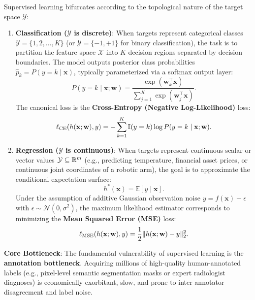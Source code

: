 Supervised learning bifurcates according to the topological nature of the target space $\mathcal{Y}$:
\begin{enumerate}
  \item \textbf{Classification ($\mathcal{Y}$ is discrete)}:
  When targets represent categorical classes $\mathcal{Y} = \{1, 2, \dots, K\}$ (or $\mathcal{Y} = \{-1, +1\}$ for binary classification), the task is to partition the feature space $\mathcal{X}$ into $K$ decision regions separated by decision boundaries. The model outputs posterior class probabilities $\hat{p}_k = P(y=k \mid \mathbf{x})$, typically parameterized via a softmax output layer:
  \begin{equation}
  P(y=k \mid \mathbf{x}; \mathbf{w}) = \frac{\exp(\mathbf{w}_k^\top \mathbf{x})}{\sum_{j=1}^K \exp(\mathbf{w}_j^\top \mathbf{x})}.
  \end{equation}
  The canonical loss is the \textbf{Cross-Entropy (Negative Log-Likelihood)} loss:
  \begin{equation}
  \ell_{\text{CE}}(h(\mathbf{x}; \mathbf{w}), y) = -\sum_{k=1}^K \mathbb{I}(y = k) \log P(y=k \mid \mathbf{x}; \mathbf{w}).
  \end{equation}

  \item \textbf{Regression ($\mathcal{Y}$ is continuous)}:
  When targets represent continuous scalar or vector values $\mathcal{Y} \subseteq \mathbb{R}^m$ (e.g., predicting temperature, financial asset prices, or continuous joint coordinates of a robotic arm), the goal is to approximate the conditional expectation surface:
  \begin{equation}
  h^*(\mathbf{x}) = \mathbb{E}[y \mid \mathbf{x}].
  \end{equation}
  Under the assumption of additive Gaussian observation noise $y = f(\mathbf{x}) + \epsilon$ with $\epsilon \sim \mathcal{N}(0, \sigma^2)$, the maximum likelihood estimator corresponds to minimizing the \textbf{Mean Squared Error (MSE)} loss:
  \begin{equation}
  \ell_{\text{MSE}}(h(\mathbf{x}; \mathbf{w}), y) = \frac{1}{2} \|h(\mathbf{x}; \mathbf{w}) - y\|_2^2.
  \end{equation}
\end{enumerate}

\textbf{Core Bottleneck}: The fundamental vulnerability of supervised learning is the \textbf{annotation bottleneck}. Acquiring millions of high-quality human-annotated labels (e.g., pixel-level semantic segmentation masks or expert radiologist diagnoses) is economically exorbitant, slow, and prone to inter-annotator disagreement and label noise.

